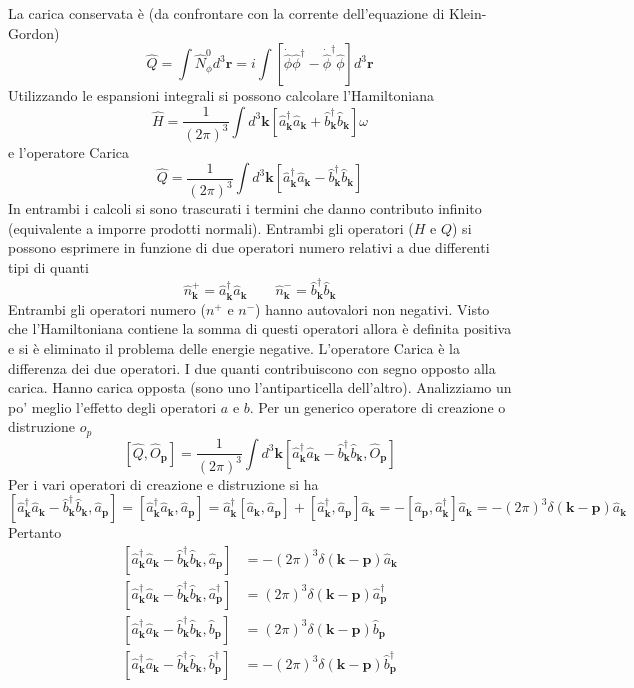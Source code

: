 La carica conservata è (da confrontare con la corrente dell'equazione di Klein-Gordon)
$$
\hat{Q} = \int \hat{N}^0_\phi d^3\mathbf{r} = i \int \left[ \dot{\hat{\phi}}\hat{\phi}^\dagger - \dot{\hat{\phi}}^\dagger\hat{\phi} \right] d^3\mathbf{r}
$$
Utilizzando le espansioni integrali si possono calcolare l'Hamiltoniana
$$
\hat{H} = \frac{1}{(2\pi)^3} \int d^3\mathbf{k} [\hat{a}_{\mathbf{k}}^\dagger \hat{a}_{\mathbf{k}} + \hat{b}_{\mathbf{k}}^\dagger \hat{b}_{\mathbf{k}}] \omega
$$
e l'operatore Carica
$$
\hat{Q} = \frac{1}{(2\pi)^3} \int d^3\mathbf{k} [\hat{a}_{\mathbf{k}}^\dagger \hat{a}_{\mathbf{k}} - \hat{b}_{\mathbf{k}}^\dagger \hat{b}_{\mathbf{k}}]
$$
In entrambi i calcoli si sono trascurati i termini che danno contributo infinito (equivalente a imporre prodotti normali). Entrambi gli operatori ($H$ e $Q$) si possono esprimere in funzione di due operatori numero relativi a due differenti tipi di quanti
$$
\hat{n}_{\mathbf{k}}^+ = \hat{a}_{\mathbf{k}}^\dagger \hat{a}_{\mathbf{k}} \qquad \hat{n}_{\mathbf{k}}^- = \hat{b}_{\mathbf{k}}^\dagger \hat{b}_{\mathbf{k}}
$$
Entrambi gli operatori numero ($n^+$ e $n^-$) hanno autovalori non negativi. Visto che l'Hamiltoniana contiene la somma di questi operatori allora è definita positiva e si è eliminato il problema delle energie negative. L'operatore Carica è la differenza dei due operatori. I due quanti contribuiscono con segno opposto alla carica. Hanno carica opposta (sono uno l'antiparticella dell'altro). Analizziamo un po' meglio l'effetto degli operatori $a$ e $b$. Per un generico operatore di creazione o distruzione $o_p$
$$
[\hat{Q}, \hat{O}_\mathbf{p}] = \frac{1}{(2\pi)^3} \int d^3\mathbf{k} [\hat{a}_\mathbf{k}^\dagger \hat{a}_\mathbf{k} - \hat{b}_\mathbf{k}^\dagger \hat{b}_\mathbf{k}, \hat{O}_\mathbf{p}]
$$
Per i vari operatori di creazione e distruzione si ha
$$
[\hat{a}_\mathbf{k}^\dagger \hat{a}_\mathbf{k} - \hat{b}_\mathbf{k}^\dagger \hat{b}_\mathbf{k}, \hat{a}_\mathbf{p}] = [\hat{a}_\mathbf{k}^\dagger \hat{a}_\mathbf{k}, \hat{a}_\mathbf{p}] = \hat{a}_\mathbf{k}^\dagger [\hat{a}_\mathbf{k}, \hat{a}_\mathbf{p}] + [\hat{a}_\mathbf{k}^\dagger, \hat{a}_\mathbf{p}] \hat{a}_\mathbf{k} = - [\hat{a}_\mathbf{p}, \hat{a}_\mathbf{k}^\dagger] \hat{a}_\mathbf{k} = -(2\pi)^3 \delta(\mathbf{k} - \mathbf{p}) \hat{a}_\mathbf{k}
$$
Pertanto
$$
\begin{aligned}
[\hat{a}_\mathbf{k}^\dagger \hat{a}_\mathbf{k} - \hat{b}_\mathbf{k}^\dagger \hat{b}_\mathbf{k}, \hat{a}_\mathbf{p}] &= -(2\pi)^3 \delta(\mathbf{k} - \mathbf{p}) \hat{a}_\mathbf{k} \\
[\hat{a}_\mathbf{k}^\dagger \hat{a}_\mathbf{k} - \hat{b}_\mathbf{k}^\dagger \hat{b}_\mathbf{k}, \hat{a}_\mathbf{p}^\dagger] &= (2\pi)^3 \delta(\mathbf{k} - \mathbf{p}) \hat{a}_\mathbf{p}^\dagger \\
[\hat{a}_\mathbf{k}^\dagger \hat{a}_\mathbf{k} - \hat{b}_\mathbf{k}^\dagger \hat{b}_\mathbf{k}, \hat{b}_\mathbf{p}] &= (2\pi)^3 \delta(\mathbf{k} - \mathbf{p}) \hat{b}_\mathbf{p} \\
[\hat{a}_\mathbf{k}^\dagger \hat{a}_\mathbf{k} - \hat{b}_\mathbf{k}^\dagger \hat{b}_\mathbf{k}, \hat{b}_\mathbf{p}^\dagger] &= -(2\pi)^3 \delta(\mathbf{k} - \mathbf{p}) \hat{b}_\mathbf{p}^\dagger
\end{aligned}
$$
